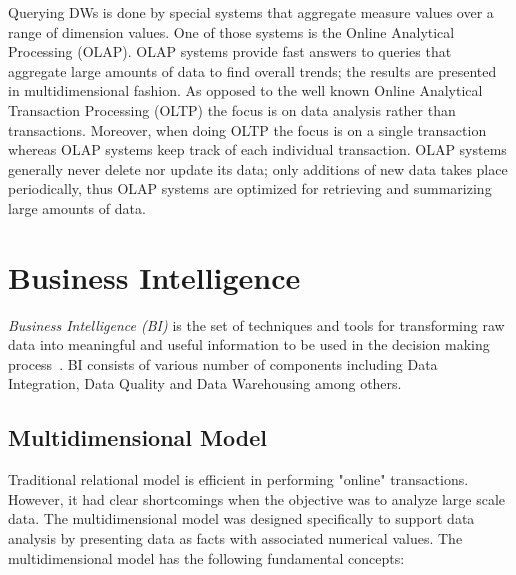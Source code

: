 Querying DWs is done by special systems that aggregate measure values over a range of dimension values. One of those systems is the Online Analytical Processing (OLAP). OLAP systems provide fast answers to queries that aggregate large amounts of data to find overall trends; the results are presented in multidimensional fashion. As opposed to the well known Online Analytical Transaction Processing (OLTP) the focus is on data analysis rather than transactions. Moreover, when doing OLTP the focus is on a single transaction whereas OLAP systems keep track of each individual transaction. OLAP systems generally never delete nor update its data; only additions of new data takes place periodically, thus OLAP systems are optimized for retrieving and summarizing large amounts of data.

\section{Business Intelligence}\label{section:businessIntelligence}

\textit{Business Intelligence (BI)} is the set of techniques and tools for transforming raw data into meaningful and useful information to be used in the decision making process~\cite{Rud:Wiley:09}. BI consists of various number of components including Data Integration, Data Quality and Data Warehousing among others.

\subsection{Multidimensional Model}

Traditional relational model is efficient in performing "online" transactions. However, it had clear shortcomings when the objective was to analyze large scale data. The multidimensional model was designed specifically to support data analysis by presenting data as facts with associated numerical values. The multidimensional model has the following fundamental concepts:

